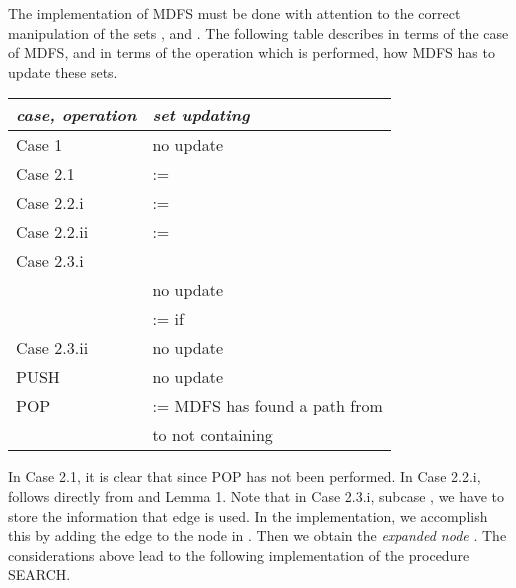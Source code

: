 \documentclass[12pt,twoside,a4paper]{article}
\begin{document}
The implementation of MDFS must be done with attention to the correct 
manipulation of the
sets , and . The following table describes in
terms of the case of MDFS, and in terms of the operation which is 
performed, how MDFS has to update these sets.
\begin{center}
\begin{tabular}{|l|l|} \hline
{\em case, operation\/}  & {\em set updating\/} \\ \hline
Case 1  &  no update \\
Case 2.1  &   :=   \\
Case 2.2.i  &  :=  \\
Case 2.2.ii  &   :=   \\
Case 2.3.i  &                                          \\
  & no update  \\
 &  :=  if  \\
Case 2.3.ii  & no update   \\
PUSH & no update \\
POP  &  :=  MDFS has found a path from \\
  &   to  not containing   \\
\hline
\end{tabular}
\end{center}
In Case 2.1, it is clear that  since POP has not been 
performed. In Case 2.2.i,  follows directly from  and Lemma 1.
Note that in Case 2.3.i, subcase , we have to 
store the information that edge  is used. In the 
implementation, we accomplish this by adding the edge  to the node 
 in .
Then we obtain the {\em expanded node} .
The considerations above lead to the following implementation of the procedure
SEARCH.

\medskip
\end{document}
